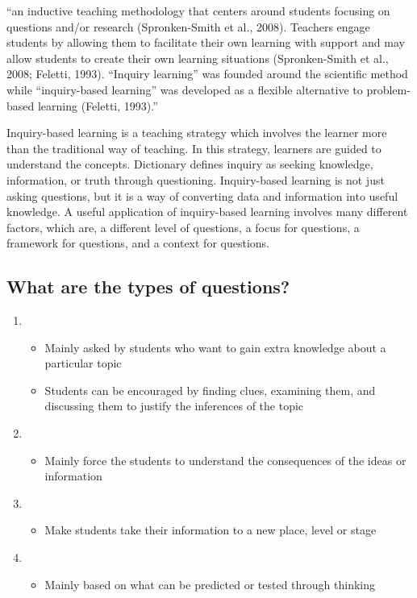 \begin{Quote}
“an inductive teaching methodology that centers around students focusing on
questions and/or research (Spronken-Smith et al., 2008). Teachers engage
students by allowing them to facilitate their own learning with support and
may allow students to create their own learning situations (Spronken-Smith et
al., 2008; Feletti, 1993). “Inquiry learning” was founded around the scientific
method while “inquiry-based learning” was developed as a flexible alternative
to problem-based learning (Feletti, 1993).”
\end{Quote}
Inquiry-based learning is a teaching strategy which involves the learner more than the
traditional way of teaching. In this strategy, learners are guided to understand the concepts.
Dictionary defines inquiry as seeking knowledge, information, or truth through questioning.
Inquiry-based learning is not just asking questions, but it is a way of converting data and
information into useful knowledge. A useful application of inquiry-based learning involves many
different factors, which are, a different level of questions, a focus for questions, a framework for
questions, and a context for questions.

\subsection*{What are the types of questions?}
\begin{definition}
\begin{enumerate}
\item {}
	\begin{itemize}
	\item Mainly asked by students who want to gain extra knowledge about a
	particular topic
	\item Students can be encouraged by finding clues, examining them, and
	discussing them to justify the inferences of the topic
	\end{itemize}
\item {}
	\begin{itemize}
	\item Mainly force the students to understand the consequences of the ideas
	or information
	\end{itemize}
\item {}
	\begin{itemize}
	\item Make students take their information to a new place, level or stage
	\end{itemize}
\item {}
	\begin{itemize}
	\item Mainly based on what can be predicted or tested through thinking
	\end{itemize}
\end{enumerate}
\end{definition}
